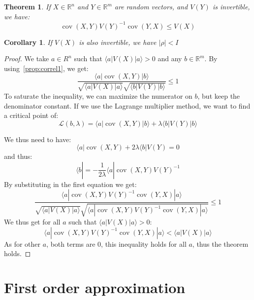 \documentclass[10pt]{report}
\theoremstyle{plain}
\newtheorem{thm}{Theorem}[chapter]
\newtheorem{cor}{Corollary}[thm]
\theoremstyle{definition}
\theoremstyle{remark}
\newcommand{\R}{\ensuremath{\mathbb{R}}}
\newcommand{\ket}[1]{|#1\rangle}
\newcommand{\bra}[1]{\langle#1|}
\renewcommand{\leq}{\leqslant}
\DeclareMathOperator{\cov}{cov}
\begin{document}
\begin{thm}\label{thm:correln}
  If $X \in \R^n$ and $Y \in \R^m$ are random vectors, and $V(Y)$ is invertible,
  we have:
  \[\cov(X,Y){V(Y)}^{-1}\cov(Y,X) \leq V(X)\]
\end{thm}

\begin{cor}
  If $V(X)$ is also invertible, we have $|\rho| < I$
\end{cor}

\begin{proof}
  We take $a \in R^n$ such that $\bra a V(X) \ket a > 0$ and any $b \in \R^m$.
  By using~\cref{prop:correl1}, we get:
  \[ \frac{ \bra a \cov(X,Y) \ket b}{\sqrt{\bra a V(X) \ket a}\sqrt{\bra b V(Y)
        \ket b}} \leq 1\]
  To saturate the inequality, we can maximize the numerator on $b$, but keep the
  denominator constant. If we use the Lagrange multiplier method, we want to
  find a critical point of:
  \[\mathcal{L}(b,\lambda) = \bra a \cov(X,Y) \ket b + \lambda \bra b V(Y) \ket
    b\]

  We thus need to have:
  \[ \bra a \cov(X,Y) + 2\lambda\bra b V(Y) = 0\]
  and thus:
  \[ \bra b = - \frac 1 {2\lambda} \bra a \cov(X,Y) {V(Y)}^{-1}\]
  By substituting in the first equation we get:
  \[ \frac{ \bra a \cov(X,Y) {V(Y)}^{-1} \cov(Y,X) \ket a}
    {\sqrt{\bra a V(X) \ket a}
      \sqrt{\bra a \cov(X,Y) {V(Y)}^{-1} \cov(Y,X) \ket a}} \leq 1\]
  We thus get for all $a$ such that $\bra a V(X) \ket a > 0$:
  \[ \bra a \cov(X,Y) {V(Y)}^{-1} \cov(Y,X) \ket a < \bra a V(X) \ket a\]
  As for other $a$, both terms are 0, this inequality holds for all $a$, thus
  the theorem holds.
\end{proof}



\section{First order approximation}
\end{document}
